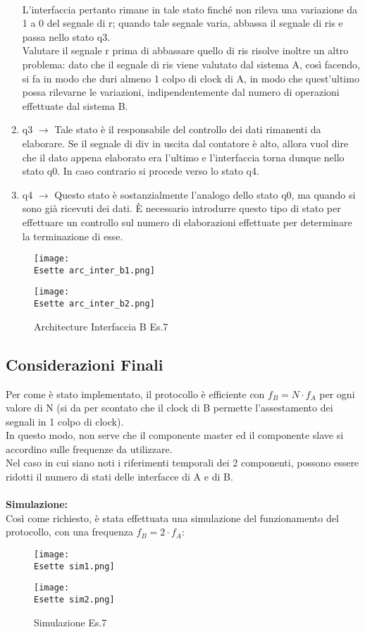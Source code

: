 \documentclass[12pt]{article}
\def \Esette {Allegati/Esercizio7/}
\begin{document}
\begin{enumerate}
          \\L’interfaccia pertanto rimane in tale stato finché non rileva una variazione da 1 a 0 del segnale di r; quando tale segnale varia, abbassa il segnale di ris e passa nello stato q3.
          \\Valutare il segnale r prima di abbassare quello di ris risolve inoltre un altro problema: dato che il segnale di ris viene valutato dal sistema A, così facendo, si fa in modo che duri almeno 1 colpo di clock di A, in modo che quest’ultimo possa rilevarne le variazioni, indipendentemente dal numero di operazioni effettuate dal sistema B.
    \item q3 $\rightarrow$ Tale stato è il responsabile del controllo dei dati rimanenti da elaborare. Se il segnale di div in uscita dal contatore è alto, allora vuol dire che il dato appena elaborato era l’ultimo e l’interfaccia torna dunque nello stato q0. In caso contrario si procede verso lo stato q4.
    \item q4 $\rightarrow$ Questo stato è sostanzialmente l’analogo dello stato q0, ma quando si sono già ricevuti dei dati.  È necessario introdurre questo tipo di stato per effettuare un controllo sul numero di elaborazioni effettuate per determinare la terminazione di esse.
\end{enumerate}
\clearpage
\begin{figure}[ht!]
    \centering
    \texttt{[image: \\Esette arc\_inter\_b1.png]}
\end{figure}
\begin{figure}[ht!]
    \centering
    \texttt{[image: \\Esette arc\_inter\_b2.png]}
    \caption{Architecture Interfaccia B Es.7}
\end{figure}
\clearpage
\subsection{Considerazioni Finali}
Per come è stato implementato, il protocollo è efficiente con $f_B=N \cdot f_A$ per ogni valore di N (si da per scontato che il clock di B permette l’assestamento dei segnali in 1 colpo di clock).
\\In questo modo, non serve che il componente master ed il componente slave si accordino sulle frequenze da utilizzare.
\\Nel caso in cui siano noti i riferimenti temporali dei 2 componenti, possono essere ridotti il numero di stati delle interfacce di A e di B.
\\\\{\large \textbf{Simulazione:}}
\\Così come richiesto, è stata effettuata una simulazione del funzionamento del protocollo, con una frequenza $f_B=2 \cdot f_A:$
\begin{figure}[ht!]
    \centering
    \texttt{[image: \\Esette sim1.png]}
\end{figure}
\begin{figure}[ht!]
    \centering
    \texttt{[image: \\Esette sim2.png]}
    \caption{Simulazione Es.7}
\end{figure}
\clearpage
\end{document}
